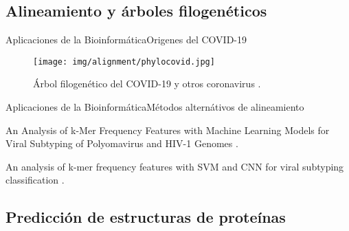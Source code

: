 \documentclass[10pt]{beamer}
\newcommand{\1}{
        	\setbeamertemplate{background}{
        		\texttt{[image: img/1]}
        		\tikz[overlay] \fill[fill opacity=0.75,fill=white] (0,0) rectangle (-\paperwidth,\paperheight);
        	}
}
\begin{document}
\subsection{Alineamiento y árboles filogenéticos}

\begin{frame}{Aplicaciones de la Bioinformática}{Origenes del COVID-19}
	\begin{figure}[]
		\centering
		\texttt{[image: img/alignment/phylocovid.jpg]}
		\caption{Árbol filogenético del COVID-19 y otros coronavirus \cite{tang2020origin}.}
	\end{figure}
\end{frame}

\begin{frame}{Aplicaciones de la Bioinformática}{Métodos alternátivos de alineamiento}
	\begin{block}{}
		An Analysis of k-Mer Frequency Features with Machine Learning Models for Viral Subtyping of Polyomavirus and HIV-1 Genomes \cite{arceda2020analysis}.
	\end{block}

	\begin{block}{}
		An analysis of k-mer frequency features with SVM and CNN for viral subtyping classification \cite{machaca2020analysis}.
	\end{block}
\end{frame}



\subsection{Predicción de estructuras de proteínas}
\end{document}
